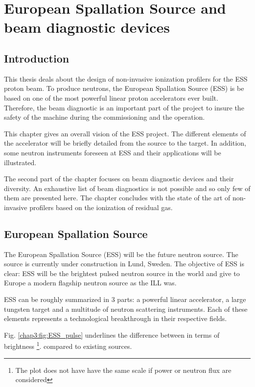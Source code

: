 \chapter{European Spallation Source and beam diagnostic devices}
\cleardoublepage

\minitoc
\section{Introduction}
\begin{refsection}
  \label{ch2:Introduction}
  This thesis deals about the design of non-invasive ionization profilers for the ESS proton beam. To produce neutrons, the European Spallation Source (ESS) is be based on one of the most powerful linear proton accelerators ever built. Therefore, the beam diagnostic is an important part of the project to insure the safety of the machine during the commissioning and the operation.

  This chapter gives an overall vision of the ESS project. The different elements of the accelerator will be briefly detailed from the source to the target. In addition, some neutron instruments foreseen at ESS and their applications will be illustrated.

  The second part of the chapter focuses on beam diagnostic devices and their diversity. An exhaustive list of beam diagnostics is not possible and so only few of them are presented here. The chapter concludes with the state of the art of non-invasive profilers based on the ionization of residual gas.

  \section{European Spallation Source}
  The European Spallation Source (ESS) will be the future neutron source. The source is currently under construction in Lund, Sweden. The objective of ESS is clear: ESS will be the brightest pulsed neutron source in the world and give to Europe a modern flagship neutron source as the ILL was.

  ESS can be roughly summarized in 3 parts: a powerful linear accelerator, a large tungsten target and a multitude of neutron scattering instruments. Each of these elements represents a technological breakthrough in their respective fields.

  Fig. \ref{chap3:fig:ESS_pulse} underlines the difference between in terms of brightness \footnote{The plot does not have have the same scale if power or neutron flux are considered}. compared to existing sources.
  


\end{refsection}
